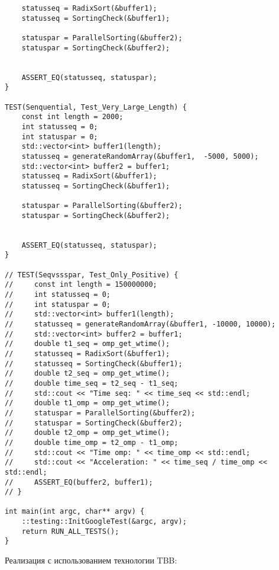 \documentclass{report}
\begin{document}
\begin{lstlisting}
    statusseq = RadixSort(&buffer1);
    statusseq = SortingCheck(&buffer1);

    statuspar = ParallelSorting(&buffer2);
    statuspar = SortingCheck(&buffer2);


    ASSERT_EQ(statusseq, statuspar);
}

TEST(Senquential, Test_Very_Large_Length) {
    const int length = 2000;
    int statusseq = 0;
    int statuspar = 0;
    std::vector<int> buffer1(length);
    statusseq = generateRandomArray(&buffer1,  -5000, 5000);
    std::vector<int> buffer2 = buffer1;
    statusseq = RadixSort(&buffer1);
    statusseq = SortingCheck(&buffer1);

    statuspar = ParallelSorting(&buffer2);
    statuspar = SortingCheck(&buffer2);


    ASSERT_EQ(statusseq, statuspar);
}

// TEST(Seqvssspar, Test_Only_Positive) {
//     const int length = 150000000;
//     int statusseq = 0;
//     int statuspar = 0;
//     std::vector<int> buffer1(length);
//     statusseq = generateRandomArray(&buffer1, -10000, 10000);
//     std::vector<int> buffer2 = buffer1;
//     double t1_seq = omp_get_wtime();
//     statusseq = RadixSort(&buffer1);
//     statusseq = SortingCheck(&buffer1);
//     double t2_seq = omp_get_wtime();
//     double time_seq = t2_seq - t1_seq;
//     std::cout << "Time seq: " << time_seq << std::endl;
//     double t1_omp = omp_get_wtime();
//     statuspar = ParallelSorting(&buffer2);
//     statuspar = SortingCheck(&buffer2);
//     double t2_omp = omp_get_wtime();
//     double time_omp = t2_omp - t1_omp;
//     std::cout << "Time omp: " << time_omp << std::endl;
//     std::cout << "Acceleration: " << time_seq / time_omp << std::endl;
//     ASSERT_EQ(buffer2, buffer1);
// }

int main(int argc, char** argv) {
    ::testing::InitGoogleTest(&argc, argv);
    return RUN_ALL_TESTS();
}

\end{lstlisting}

\par Реализация с использованием технологии TBB:
\end{document}
